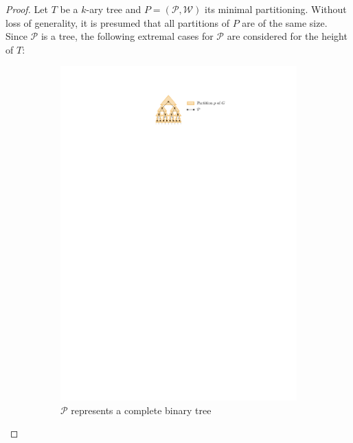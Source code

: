\begin{proof}
	Let $T$ be a $k$-ary tree and $P=(\mathcal{P},\mathcal{W})$ its minimal partitioning. Without loss of generality, it is presumed that all partitions of $P$ are of the same size. Since $\mathcal{P}$ is a tree, the following extremal cases for $\mathcal{P}$ are considered for the height of $T$:
	\begin{figure}[H]
		\centering
		\begin{subfigure}{0.6\textwidth}
			\centering
			\includegraphics[page=1,width=\linewidth]{graphics/Partitioning_scheme.pdf}
			\caption{$\mathcal{P}$ represents a complete binary tree}\label{im:partitioning_binary}
		\end{subfigure}
		\begin{subfigure}{0.6\textwidth}
			\centering

\end{subfigure}
\end{figure}
\end{proof}
